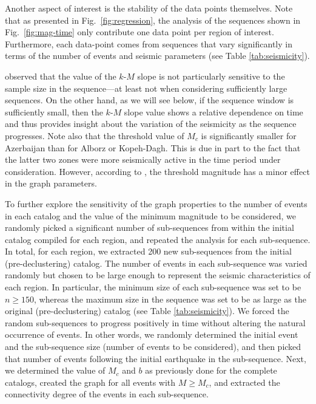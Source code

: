 Another aspect of interest is the stability of the data points themselves. Note that as presented in Fig.~\ref{fig:regression}, the analysis of the sequences shown in Fig.~\ref{fig:mag-time} only contribute one data point per region of interest. Furthermore, each data-point comes from sequences that vary significantly in terms of the number of events and seismic parameters (see Table \ref{tab:seismicity}). 

\citet{Telesca2013} observed that the value of the $k$-$M$ slope is not particularly sensitive to the sample size in the sequence---at least not when considering sufficiently large sequences. On the other hand, as we will see below, if the sequence window is sufficiently small, then the $k$-$M$ slope value shows a relative dependence on time and thus provides insight about the variation of the seismicity as the sequence progresses. Note also that the threshold value of $M_c$ is significantly smaller for Azerbaijan than for Alborz or Kopeh-Dagh. This is due in part to the fact that the latter two zones were more seismically active in the time period under consideration. However, according to \citet{Telesca2012}, the threshold magnitude has a minor effect in the graph parameters.

To further explore the sensitivity of the graph properties to the number of events in each catalog and the value of the minimum magnitude to be considered, we randomly picked a significant number of sub-sequences from within the initial catalog compiled for each region, and repeated the analysis for each sub-sequence. In total, for each region, we extracted 200 new sub-sequences from the initial (pre-declustering) catalog. The number of events in each sub-sequence was varied randomly but chosen to be large enough to represent the seismic characteristics of each region. In particular, the minimum size of each sub-sequence was set to be $n \geq 150$, whereas the maximum size in the sequence was set to be as large as the original (pre-declustering) catalog (see Table \ref{tab:seismicity}). We forced the random sub-sequences to progress positively in time without altering the natural occurrence of events. In other words, we randomly determined the initial event and the sub-sequence size (number of events to be considered), and then picked that number of events following the initial earthquake in the sub-sequence. Next, we determined the value of $M_c$ and $b$ as previously done for the complete catalogs, created the graph for all events with $M \geq M_c$, and extracted the connectivity degree of the events in each sub-sequence. 

